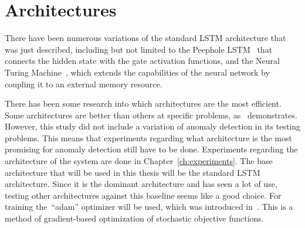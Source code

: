 \section{Architectures}

There have been numerous variations of the standard LSTM architecture that was just described, including but not limited to the Peephole LSTM~\cite{gers2002learning} that connects the hidden state with the gate activation functions, and the Neural Turing Machine~\cite{graves2014neural}, which extends the capabilities of the neural network by coupling it to an external memory resource.

There has been some research into which architectures are the most efficient. Some architectures are better than others at specific problems, as~\cite{jozefowicz2015empirical} demonstrates. However, this study did not include a variation of anomaly detection in its testing problems. This means that experiments regarding what architecture is the most promising for anomaly detection still have to be done. Experiments regarding the architecture of the system are done in Chapter~\ref{ch:experiments}. The base architecture that will be used in this thesis will be the standard LSTM architecture. Since it is the dominant architecture and has seen a lot of use, testing other architectures against this baseline seems like a good choice. For training the~\enquote{adam} optimizer will be used, which was introduced in~\cite{kingma2014adam}. This is a method of gradient-based optimization of stochastic objective functions.